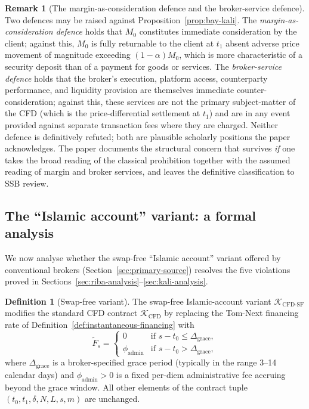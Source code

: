 \documentclass[preprint,12pt,authoryear]{elsarticle}
\theoremstyle{definition}
\newtheorem{definition}{Definition}[section]
\newtheorem{remark}{Remark}[section]
\begin{document}
\begin{remark}[The margin-as-consideration defence and the
    broker-service defence]
\label{rem:margin-consideration}
Two defences may be raised against
Proposition~\ref{prop:bay-kali}. The \emph{margin-as-consideration
defence} holds that $M_0$ constitutes immediate consideration by
the client; against this, $M_0$ is fully returnable to the client
at $t_1$ absent adverse price movement of magnitude exceeding
$(1-\alpha) M_0$, which is more characteristic of a security
deposit than of a payment for goods or services. The
\emph{broker-service defence} holds that the broker's execution,
platform access, counterparty performance, and liquidity
provision are themselves immediate counter-consideration; against
this, these services are not the primary subject-matter of the
CFD (which is the price-differential settlement at $t_1$) and are
in any event provided against separate transaction fees where
they are charged. Neither defence is definitively refuted; both
are plausible scholarly positions the paper acknowledges. The
paper documents the structural concern that survives \emph{if} one
takes the broad reading of the classical prohibition together with
the assumed reading of margin and broker services, and leaves the
definitive classification to SSB review.
\end{remark}

\subsection{The ``Islamic account'' variant: a formal analysis}
\label{sec:swap-free}

We now analyse whether the swap-free ``Islamic account'' variant
offered by conventional brokers (Section~\ref{sec:primary-source})
resolves the five violations proved in
Sections~\ref{sec:riba-analysis}--\ref{sec:kali-analysis}.

\begin{definition}[Swap-free variant]
\label{def:swap-free}
The swap-free Islamic-account variant
$\mathcal{K}_{\text{CFD-SF}}$ modifies the standard CFD contract
$\mathcal{K}_{\text{CFD}}$ by replacing the Tom-Next financing rate
of Definition~\ref{def:instantaneous-financing} with
\begin{equation}
    \widetilde{F}_s =
    \begin{cases}
        0
        & \text{if } s - t_0 \leq \Delta_{\text{grace}}, \\[4pt]
        \phi_{\text{admin}}
        & \text{if } s - t_0 > \Delta_{\text{grace}},
    \end{cases}
    \label{eq:swap-free-rate}
\end{equation}
where $\Delta_{\text{grace}}$ is a broker-specified grace period
(typically in the range 3--14 calendar days) and
$\phi_{\text{admin}} > 0$ is a fixed per-diem administrative fee
accruing beyond the grace window. All other elements of the
contract tuple $(t_0, t_1, \delta, N, L, s, m)$ are unchanged.
\end{definition}
\end{document}
